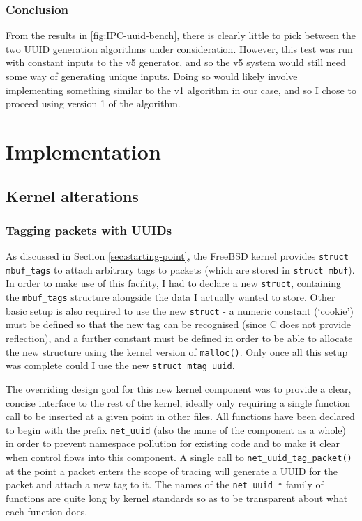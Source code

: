 \documentclass[a4paper,12pt,twoside,openright]{report}
\begin{document}
	\subsection{Conclusion}
	
	From the results in \figurename{\ref{fig:IPC-uuid-bench}}, there is clearly little to pick between the two UUID generation algorithms under consideration. However, this test was run with constant inputs to the v5 generator, and so the v5 system would still need some way of generating unique inputs. Doing so would likely involve implementing something similar to the v1 algorithm in our case, and so I chose to proceed using version 1 of the algorithm.
	
	
	\chapter{Implementation}
	
	\section{Kernel alterations}
	
	\subsection{Tagging packets with UUIDs}
	
	As discussed in Section \ref{sec:starting-point}, the FreeBSD kernel provides \verb|struct mbuf_tags| to attach arbitrary tags to packets (which are stored in \verb|struct mbuf|). In order to make use of this facility, I had to declare a new \verb|struct|, containing the \verb|mbuf_tags| structure alongside the data I actually wanted to store. Other basic setup is also required to use the new \verb|struct| - a numeric constant (`cookie') must be defined so that the new tag can be recognised (since C does not provide reflection), and a further constant must be defined in order to be able to allocate the new structure using the kernel version of \verb|malloc()|. Only once all this setup was complete could I use the new \verb|struct mtag_uuid|.
	
	The overriding design goal for this new kernel component was to provide a clear, concise interface to the rest of the kernel, ideally only requiring a single function call to be inserted at a given point in other files. All functions have been declared to begin with the prefix \verb|net_uuid| (also the name of the component as a whole) in order to prevent namespace pollution for existing code and to make it clear when control flows into this component. A single call to \verb|net_uuid_tag_packet()| at the point a packet enters the scope of tracing will generate a UUID for the packet and attach a new tag to it. The names of the \verb|net_uuid_*| family of functions are quite long by kernel standards so as to be transparent about what each function does.
	
\end{document}
